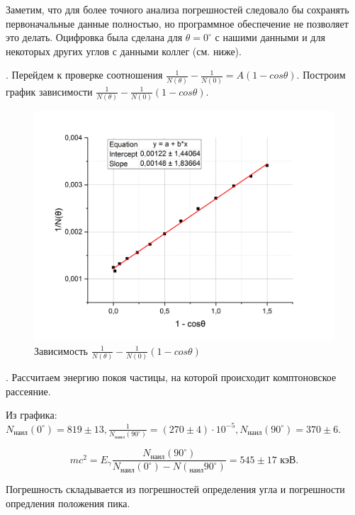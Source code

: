 \documentclass[a4paper,12pt]{article} %
\begin{document}
\medskip

\noindent Заметим, что для более точного анализа погрешностей следовало бы сохранять первоначальные данные полностью, но программное обеспечение не позволяет это делать. Оцифровка была сделана для $\theta = 0 ^\circ$ с нашими данными и для некоторых других углов с данными коллег (см. ниже).

\medskip

. Перейдем к проверке соотношения $\frac{1}{N(\theta)} - \frac{1}{N(0)} = A(1 - cos \theta).$ Построим график зависимости $\frac{1}{N(\theta)} - \frac{1}{N(0)}(1 - cos \theta)$.

\begin{figure}[h!]
    \centering
    \includegraphics[scale=0.5]{гр.png}
    \caption{Зависимость $\frac{1}{N(\theta)} - \frac{1}{N(0)}(1 - cos \theta)$}
\end{figure}

. Рассчитаем энергию покоя частицы, на которой происходит комптоновское рассеяние.

\medskip

\noindent Из графика: $N_\text{наил}(0 ^\circ) = 819 \pm 13, \frac{1}{N_\text{наил}(90 ^\circ)} = (270 \pm 4) \cdot 10^{-5}, N_\text{наил}(90 ^\circ) = 370 \pm 6.$

$$mc^2 = E_{\gamma} \frac{N_\text{наил}(90 ^\circ)}{N_\text{наил}(0^\circ)-N(_\text{наил}90^\circ)} = 545 \pm 17 \text{ кэВ}.$$

\noindent Погрешность складывается из погрешностей определения угла и погрешности опредления положения пика.
\end{document}
